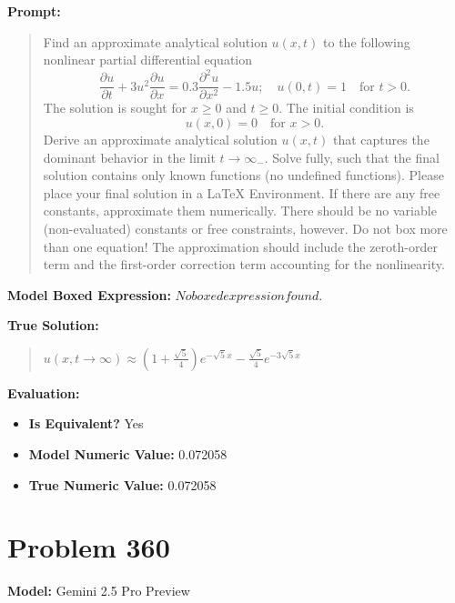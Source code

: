 \documentclass{article}
\begin{document}
{\textbf{Prompt:}
\begin{quote}
Find an approximate analytical solution $u(x, t)$ to the following nonlinear partial differential equation $$\frac{\partial u}{\partial t} + 3u^2 \frac{\partial u}{\partial x} = 0.3 \frac{\partial^2 u}{\partial x^2} - 1.5 u; \quad u(0, t) = 1 \quad \text{for } t > 0.$$ The solution is sought for $x \ge 0$ and $t \ge 0$. The initial condition is $$u(x, 0) = 0 \quad \text{for } x > 0.$$ Derive an approximate analytical solution $u(x, t)$ that captures the dominant behavior in the limit $t \rightarrow \infty_-$. Solve fully, such that the final solution contains only known functions (no undefined functions). Please place your final solution in a \boxed{} LaTeX Environment. If there are any free constants, approximate them numerically. There should be no variable (non-evaluated) constants or free constraints, however. Do not box more than one equation! The approximation should include the zeroth-order term and the first-order correction term accounting for the nonlinearity.
\end{quote}
\textbf{Model Boxed Expression:} $No boxed expression found.$

\textbf{True Solution:}
\begin{quote}
$u(x, t \rightarrow \infty) \approx \left(1 + \frac{\sqrt{5}}{4}\right) e^{-\sqrt{5}x} - \frac{\sqrt{5}}{4} e^{-3\sqrt{5}x}$
\end{quote}

\textbf{Evaluation:}
\begin{itemize}
\item \textbf{Is Equivalent?} Yes
\item \textbf{Model Numeric Value:} 0.072058
\item \textbf{True Numeric Value:} 0.072058
\end{itemize}
\vspace{1cm}
\section*{Problem 360}
\textbf{Model:} Gemini 2.5 Pro Preview

}
\end{document}
